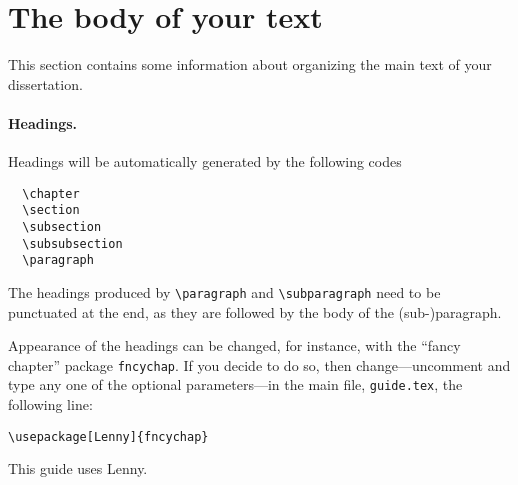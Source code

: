 \section{The body of your text}
This section contains some information about organizing the main
text of your dissertation.

\paragraph*{Headings.}
Headings will be automatically generated by the following codes
\begin{verbatim}
  \chapter
  \section
  \subsection
  \subsubsection
  \paragraph
\end{verbatim}
The headings produced by \verb|\paragraph| and \verb|\subparagraph| 
need to be punctuated at the end,
as they are followed by the body of the (sub-)paragraph.

Appearance of the headings can be changed, for instance, with the ``fancy chapter'' package \texttt{fncychap}. If you decide to do so, then change---uncomment and type any one of the optional parameters---in the main file, \texttt{guide.tex}, the following line:
\begin{verbatim}
\usepackage[Lenny]{fncychap}
\end{verbatim}
This guide uses Lenny. 

